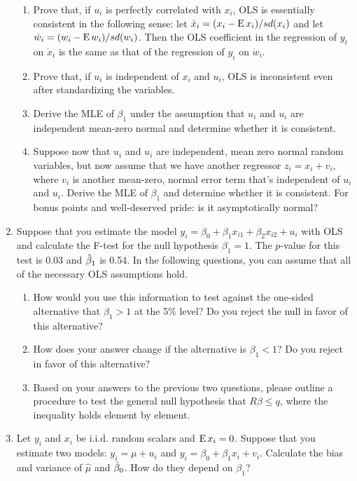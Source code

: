 \begin{enumerate}
  \begin{enumerate}
  \item Prove that, if $u_i$ is perfectly correlated with $x_i$, OLS
    is essentially consistent in the following sense: let $\dot x_i =
    (x_i - \operatorname{E} x_i) / sd(x_i)$ and let $\dot w_i = (w_i - \operatorname{E} w_i) /
    sd(w_i)$.  Then the OLS coefficient in the regression of $y_t$ on
    $\dot x_i$ is the same as that of the regression of $y_i$ on $\dot
    w_i$.
  \item Prove that, if $u_i$ is independent of $x_i$ and $u_i$, OLS is
    inconsistent even after standardizing the variables.
  \item Derive the MLE of $\beta_1$ under the assumption that $u_i$ and
    $u_i$ are independent mean-zero normal and determine whether it is
    consistent.
  \item Suppose now that $u_i$ and $u_i$ are independent, mean zero
    normal random variables, but now assume that we have another
    regressor $z_i = x_i + v_i$, where $v_i$ is another mean-zero,
    normal error term that's independent of $u_i$ and $u_i$.  Derive
    the MLE of $\beta_1$ and determine whether it is consistent.  For bonus
    points and well-deserved pride: is it asymptotically normal?
  \end{enumerate}

\item Suppose that you estimate the model $y_i = \beta_0 + \beta_1 x_{i1} + \beta_2
  x_{i2} + u_i$ with OLS and calculate the F-test for the null
  hypothesis $\beta_1 = 1$.  The $p$-value for this test is $0.03$ and
  $\hat{\beta}_1$ is 0.54.  In the following questions, you can assume that all
  of the necessary OLS assumptions hold.

  \begin{enumerate}
  \item How would you use this information to test against the
    one-sided alternative that $\beta_1 > 1$ at the 5\% level?  Do you
    reject the null in favor of this alternative?
  \item How does your answer change if the alternative is $\beta_1 < 1$?
    Do you reject in favor of this alternative?
  \item Based on your answers to the previous two questions, please
    outline a procedure to test the general null hypothesis that $R\beta \leq
    q$, where the inequality holds element by element.
  \end{enumerate}

\item Let $y_i$ and $x_i$ be i.i.d. random scalars and $\operatorname{E} x_i = 0$.
  Suppose that you estimate two models: $y_i = \mu + u_i$ and $y_i =
  \beta_0 + \beta_1 x_i + v_i.$ Calculate the bias and variance of
  $\hat \mu$ and $\hat{\beta}_0$.  How do they depend on $\beta_1$?


\end{enumerate}
